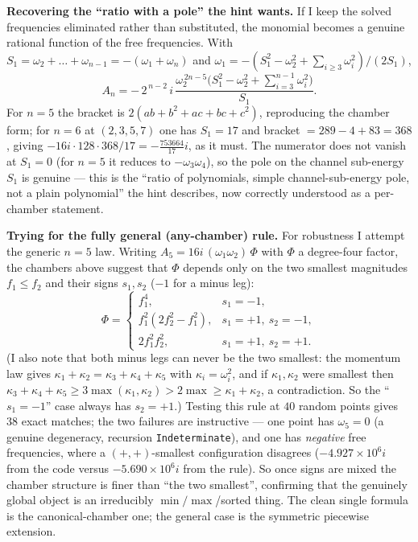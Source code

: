 \documentclass[11pt]{article}
\begin{document}
\medskip
\noindent\textbf{Recovering the ``ratio with a pole'' the hint wants.}
If I keep the solved frequencies eliminated rather than substituted, the monomial becomes a
genuine rational function of the free frequencies. With $S_1=\omega_2+\dots+\omega_{n-1}=
-(\omega_1+\omega_n)$ and
$\omega_1=-(S_1^2-\omega_2^2+\sum_{i\ge3}\omega_i^2)/(2S_1)$,
\[
A_n=-\,2^{\,n-2}\,i\,
\frac{\omega_2^{\,2n-5}\bigl(S_1^2-\omega_2^2+\sum_{i=3}^{n-1}\omega_i^2\bigr)}{S_1}.
\]
For $n=5$ the bracket is $2(ab+b^2+ac+bc+c^2)$, reproducing the chamber form; for $n=6$ at
$(2,3,5,7)$ one has $S_1=17$ and bracket $=289-4+83=368$, giving $-16i\cdot128\cdot368/17=
-\tfrac{753664}{17}i$, as it must. The numerator does not vanish at $S_1=0$ (for $n=5$ it
reduces to $-\omega_3\omega_4$), so the pole on the channel sub-energy $S_1$ is genuine ---
this is the ``ratio of polynomials, simple channel-sub-energy pole, not a plain polynomial''
the hint describes, now correctly understood as a per-chamber statement.

\medskip
\noindent\textbf{Trying for the fully general (any-chamber) rule.}
For robustness I attempt the generic $n=5$ law. Writing $A_5=16i\,(\omega_1\omega_2)\,\Phi$
with $\Phi$ a degree-four factor, the chambers above suggest that $\Phi$ depends only on the
two smallest magnitudes $f_1\le f_2$ and their signs $s_1,s_2$ ($-1$ for a minus leg):
\[
\Phi=\begin{cases}
f_1^4,& s_1=-1,\\
f_1^2(2f_2^2-f_1^2),& s_1=+1,\ s_2=-1,\\
2f_1^2f_2^2,& s_1=+1,\ s_2=+1.
\end{cases}
\]
(I also note that both minus legs can never be the two smallest: the momentum law gives
$\kappa_1+\kappa_2=\kappa_3+\kappa_4+\kappa_5$ with $\kappa_i=\omega_i^2$, and if
$\kappa_1,\kappa_2$ were smallest then $\kappa_3+\kappa_4+\kappa_5\ge3\max(\kappa_1,\kappa_2)
>2\max\ge\kappa_1+\kappa_2$, a contradiction. So the ``$s_1=-1$'' case always has $s_2=+1$.)
Testing this rule at $40$ random points gives $38$ exact matches; the two failures are
instructive --- one point has $\omega_5=0$ (a genuine degeneracy, recursion
\texttt{Indeterminate}), and one has \emph{negative} free frequencies, where a
$(+,+)$-smallest configuration disagrees ($-4.927\times10^6 i$ from the code versus
$-5.690\times10^6 i$ from the rule). So once signs are mixed the chamber structure is finer
than ``the two smallest'', confirming that the genuinely global object is an irreducibly
$\min/\max$/sorted thing. The clean single formula is the canonical-chamber one; the general
case is the symmetric piecewise extension.
\end{document}
